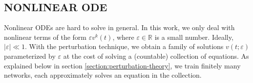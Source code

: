 \documentclass[accepted]{uai2023}
\begin{document}

\subsection{NONLINEAR ODE}
    Nonlinear ODEs are hard to solve in general. 
    In this work, we only deal with nonlinear terms of the form $\varepsilon v^k(t)$, where $\varepsilon \in \mathbb{R}$ is a small number. 
    Ideally, $|\varepsilon| \ll 1$. 
    With the perturbation technique, we obtain a family of solutions $v(t;\varepsilon)$ parameterized by $\varepsilon$ at the cost of solving a (countable) collection of equations. 
    As explained below in section \ref{section:perturbation-theory}, we train finitely many networks, each approximately solves an equation in the collection.
\end{document}
